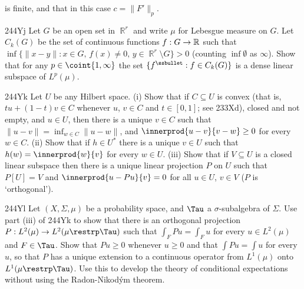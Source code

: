 {

\noindent is finite, and that in this case $c=\|F'\|_p$.   

\spheader 244Yj
 Let $G$ be an open set in $\BbbR^r$ and write $\mu$ for
Lebesgue measure on $G$.   Let $C_k(G)$ be the set of
continuous functions $f:G\to\Bbb R$ such that
$\inf\{\|x-y\|:x\in G,\,f(x)\ne 0,\,y\in\BbbR^r\setminus G\}>0$
(counting $\inf\emptyset$ as $\infty$).
Show that for any $p\in\coint{1,\infty}$ the set
$\{f^{\ssbullet}:f\in C_k(G)\}$ is a dense linear subspace of
$L^p(\mu)$.

\spheader 244Yk
 Let $U$ be any Hilbert space.   (i) Show that if
$C\subseteq U$ is convex (that is, $tu+(1-t)v\in C$ whenever
$u$, $v\in C$ and $t\in[0,1]$;  see 233Xd), closed and not empty, and
$u\in U$, then there is a unique $v\in C$ such that
$\|u-v\|=\inf_{w\in C}\|u-w\|$, and $\innerprod{u-v}{v-w}\ge 0$ for
every $w\in C$.   (ii) Show that if $h\in U^*$ there is a unique
$v\in U$
such that $h(w)=\innerprod{w}{v}$ for every $w\in U$.      (iii) Show that if $V\subseteq U$ is a
closed linear subspace then there is a unique linear projection $P$ on
$U$ such that $P[U]=V$ and $\innerprod{u-Pu}{v}=0$ for all $u\in U$,
$v\in V$ ($P$ is `orthogonal').   

\spheader 244Yl
 Let $(X,\Sigma,\mu)$ be a probability space, and $\Tau$
a $\sigma$-subalgebra of $\Sigma$.   Use part (iii) of 244Yk to show
that there is an orthogonal projection
$P:L^2(\mu)\to L^2(\mu\restrp\Tau)$ such
that $\int_FPu=\int_Fu$ for every $u\in L^2(\mu)$ and $F\in\Tau$.   Show
that $Pu\ge 0$ whenever $u\ge 0$ and that $\int Pu=\int u$ for every
$u$, so that $P$ has a unique extension to a continuous operator from
$L^1(\mu)$ onto $L^1(\mu\restrp\Tau)$.   Use this to develop the theory
of conditional expectations without using the Radon-Nikod\'ym theorem.

}
